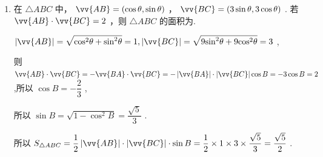 \begin{enumerate}
\begin{enumerate}
\begin{jieda}
            则三角形面积 $S = \dfrac{1}{2}{bc}\sin A = 4 \times  \dfrac{\sqrt{3}}{2} = 2\sqrt{3}$
        \end{jieda}
        \item 在 $\bigtriangleup  {ABC}$ 中， $\vv{AB} = \left( {\cos \theta ,\sin \theta }\right)$ ， $\vv{BC} = \left( {3\sin \theta ,3\cos \theta }\right)$ . 若 $\vv{AB} \cdot  \vv{BC} = 2$ ，则 $\bigtriangleup  {ABC}$ 的面积为.
        \begin{jieda}
            $\left| \vv{AB}\right|  = \sqrt{{\cos }^{2}\theta  + {\sin }^{2}\theta } = 1,\left| \vv{BC}\right|  = \sqrt{9{\sin }^{2}\theta  + 9{\cos }^{2}\theta } = 3$ ,
            
            则 $\vv{AB} \cdot  \vv{BC} =  - \vv{BA} \cdot  \vv{BC} =  - \left| \vv{BA}\right|  \cdot  \left| \vv{BC}\right| \cos B =  - 3\cos B = 2$ ,所以 $\cos B =  - \dfrac{2}{3}$ ,
            
            所以 $\sin B = \sqrt{1 - {\cos }^{2}B} = \dfrac{\sqrt{5}}{3}$ .
            
            所以 ${S}_{\bigtriangleup {ABC}} = \dfrac{1}{2}\left| \vv{AB}\right|  \cdot  \left| \vv{BC}\right|  \cdot  \sin B = \dfrac{1}{2} \times  1 \times  3 \times  \dfrac{\sqrt{5}}{3} = \dfrac{\sqrt{5}}{2}$ .
        \end{jieda}


\end{enumerate}
\end{enumerate}
